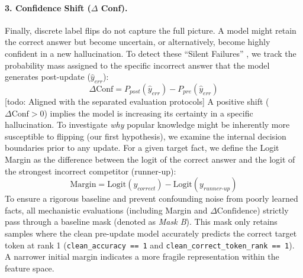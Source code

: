 \paragraph{3. Confidence Shift ($\Delta$ Conf).}
Finally, discrete label flips do not capture the full picture. A model might retain the correct answer but become uncertain, or alternatively, become highly confident in a new hallucination. To detect these ``Silent Failures'' \cite{guo2017calibration}, we track the probability mass assigned to the specific incorrect answer that the model generates post-update ($\hat{y}_{err}$):
\begin{equation}
    \Delta \text{Conf} = P_{post}(\hat{y}_{err}) - P_{pre}(\hat{y}_{err})
\end{equation}
[todo: Aligned with the separated evaluation protocols] A positive shift ($\Delta \text{Conf} > 0$) implies the model is increasing its certainty in a specific hallucination.
To investigate \textit{why} popular knowledge might be inherently more susceptible to flipping (our first hypothesis), we examine the internal decision boundaries prior to any update. For a given target fact, we define the Logit Margin as the difference between the logit of the correct answer and the logit of the strongest incorrect competitor (runner-up):
\begin{equation}
    \text{Margin} = \text{Logit}(y_{correct}) - \text{Logit}(y_{runner\text{-}up})
\end{equation}
To ensure a rigorous baseline and prevent confounding noise from poorly learned facts, all mechanistic evaluations (including Margin and $\Delta \text{Confidence}$) strictly pass through a baseline mask (denoted as \textit{Mask B}). This mask only retains samples where the clean pre-update model accurately predicts the correct target token at rank 1 (\texttt{clean\_accuracy == 1} and \texttt{clean\_correct\_token\_rank == 1}). A narrower initial margin indicates a more fragile representation within the feature space.

